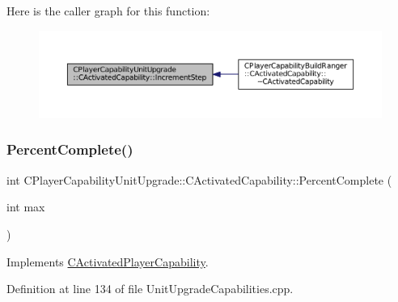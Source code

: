 Here is the caller graph for this function\+:\nopagebreak
\begin{figure}[H]
\begin{center}
\leavevmode
\includegraphics[width=350pt]{classCPlayerCapabilityUnitUpgrade_1_1CActivatedCapability_a86833312cb2f2460e923808fe0e19223_icgraph}
\end{center}
\end{figure}
\hypertarget{classCPlayerCapabilityUnitUpgrade_1_1CActivatedCapability_a16026f30b1ec10fbd4cb7049d0b74719}{}\label{classCPlayerCapabilityUnitUpgrade_1_1CActivatedCapability_a16026f30b1ec10fbd4cb7049d0b74719} 
\subsubsection{\texorpdfstring{Percent\+Complete()}{PercentComplete()}}
{\footnotesize\ttfamily int C\+Player\+Capability\+Unit\+Upgrade\+::\+C\+Activated\+Capability\+::\+Percent\+Complete (\begin{DoxyParamCaption}\item[{int}]{max }\end{DoxyParamCaption})\hspace{0.3cm}{\ttfamily [virtual]}}



Implements \hyperlink{classCActivatedPlayerCapability_a405dc6076058006a4f801727de4cfe4d}{C\+Activated\+Player\+Capability}.



Definition at line 134 of file Unit\+Upgrade\+Capabilities.\+cpp.


